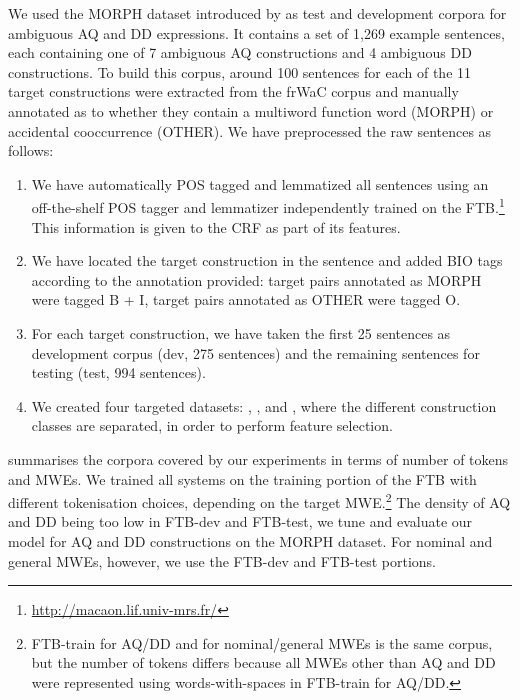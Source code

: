 \documentclass[output=paper,modfonts]{langscibook}
\begin{document}
We used the MORPH dataset introduced by \citet{nasr:acl:2015} as test and development corpora for ambiguous AQ and DD expressions. It contains a set of 1,269 example sentences, each containing one of %
7 ambiguous AQ constructions and 4 ambiguous DD constructions. To build this corpus, around 100 sentences for each of the 11 target constructions were extracted from the frWaC corpus and manually annotated as to whether they contain a multiword function word (MORPH) or accidental cooccurrence (OTHER). We have preprocessed the raw sentences as follows:
\begin{enumerate}
 \item We have automatically POS tagged and lemmatized all sentences using an off-the-shelf POS tagger and lemmatizer independently trained on the FTB.\footnote{\url{http://macaon.lif.univ-mrs.fr/}} This information is given to the CRF as part of its features.
 \item We have located the target construction in the sentence and added BIO tags according to the annotation provided: target pairs annotated as MORPH were tagged {\textsc B} + {\textsc I}, target pairs annotated as OTHER were tagged {\textsc O}.
 \item For each target construction, we have taken the first 25 sentences as development corpus (dev, 275 sentences) and the remaining sentences for testing (test, 994 sentences).
 \item We created four targeted datasets: \devAQ{}, \devDD{}, \fullAQ{} and \fullDD{}, where the different construction classes are separated, in order to perform feature selection.
\end{enumerate}

 summarises the corpora covered by our experiments in terms of number of tokens and MWEs. We trained all systems on the training portion of the FTB with different tokenisation choices, depending on the target MWE.\footnote{FTB-train for AQ/DD and for nominal/general MWEs is the same corpus, but the number of tokens differs because all MWEs other than AQ and DD were represented using words-with-spaces in FTB-train for AQ/DD.} The density of AQ and DD being too low in FTB-dev and FTB-test, we tune and evaluate our model for AQ and DD constructions on the MORPH dataset. For nominal and general MWEs, however, we use the FTB-dev and FTB-test portions.
\end{document}

